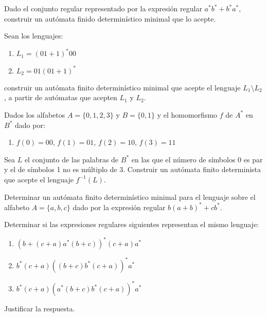 \begin{ejercicio}\label{ej:1.3.14}
    Dado el conjunto regular representado por la expresión regular $a^\ast b^\ast + b^\ast a^\ast$, construir un autómata finido determinístico minimal que lo acepte.
\end{ejercicio}

\begin{ejercicio}\label{ej:1.3.15}
    Sean los lenguajes:
    \begin{enumerate}
        \item $L_1={(01+1)}^{\ast}00$
        \item $L_2=01{(01+1)}^{\ast}$
    \end{enumerate}
    construir un autómata finito determinístico minimal que acepte el lenguaje $L_1 \setminus L_2$, a partir de autómatas que acepten $L_1$ y $L_2$.

\end{ejercicio}

\begin{ejercicio}\label{ej:1.3.16}
    Dados los alfabetos $A=\{0,1,2,3\}$ y $B=\{0,1\}$ y el homomorfismo $f$ de $A^\ast$ en $B^\ast$ dado por:
    \begin{enumerate}
        \item $f(0)=00$, $f(1)=01$, $f(2)=10$, $f(3)=11$
    \end{enumerate}
    Sea $L$ el conjunto de las palabras de $B^\ast$ en las que el número de símbolos 0 es par y el de símbolos 1 no es múltiplo de 3. Construir un autómata finito determinista que acepte el lenguaje $f^{-1}(L)$.
\end{ejercicio}

\begin{ejercicio}\label{ej:1.3.17}
    Determinar un autómata finito determinístico minimal para el lenguaje sobre el alfabeto $A=\{a,b,c\}$ dado por la expresión regular $b{(a+b)}^{\ast}+cb^\ast$.
\end{ejercicio}

\begin{ejercicio}\label{ej:1.3.18}
    Determinar si las expresiones regulares siguientes representan el mismo lenguaje:
    \begin{enumerate}
        \item ${(b+(c+a)a^\ast (b+c))}^{\ast} (c+a)a^\ast$
        \item $b^\ast (c+a) {((b+c)b^\ast (c+a))}^{\ast}a^\ast$
        \item $b^\ast (c+a){(a^\ast (b+c)b^\ast (c+a))}^{\ast}a^\ast$
    \end{enumerate}
    Justificar la respuesta.
\end{ejercicio}

